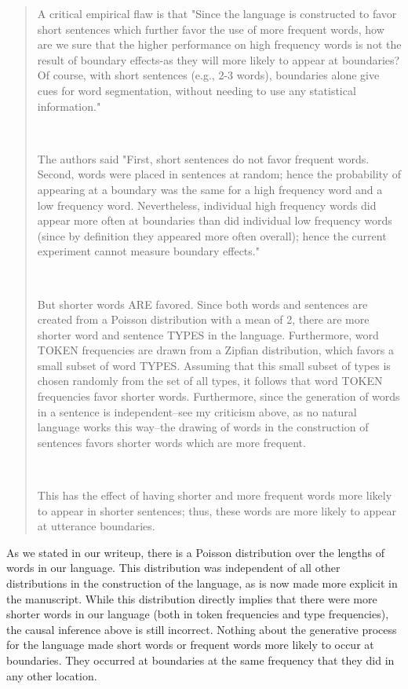 \documentclass[12pt]{letter}
\begin{document}
\begin{quote}
A critical empirical flaw is that "Since the language is constructed to favor short sentences which further favor the use of more frequent words, how are we sure that the higher performance on high frequency words is not the result of boundary effects-as they will more likely to appear at boundaries? Of course, with short sentences (e.g., 2-3 words), boundaries alone give cues for word segmentation, without needing to use any statistical information."

~

The authors said "First, short sentences do not favor frequent words. Second, words were placed in sentences at random; hence the probability of appearing at a boundary was the same for a high frequency word and a low frequency word. Nevertheless, individual high frequency words did appear more often at boundaries than did individual low frequency words (since by definition they appeared more often overall); hence the current experiment cannot measure boundary effects."

~

But shorter words ARE favored. Since both words and sentences are created from a Poisson distribution with a mean of 2, there are more shorter word and sentence TYPES in the language. Furthermore, word TOKEN frequencies are drawn from a Zipfian distribution, which favors a small subset of word TYPES. Assuming that this small subset of types is chosen randomly from the set of all types, it follows that word TOKEN frequencies favor shorter words. Furthermore, since the generation of words in a sentence is independent--see my criticism above, as no natural language works this way--the drawing of words in the construction of sentences favors shorter words which are more frequent.

~ 

This has the effect of having shorter and more frequent words more likely to appear in shorter sentences; thus, these words are more likely to appear at utterance boundaries. 
\end{quote}

As we stated in our writeup, there is a Poisson distribution over the lengths of words in our language. This distribution was independent of all other distributions in the construction of the language, as is now made more explicit in the manuscript. While this distribution directly implies that there were more shorter words in our language (both in token frequencies and type frequencies), the causal inference above is still incorrect. Nothing about the generative process for the language made short words or frequent words more likely to occur at boundaries. They occurred at boundaries at the same frequency that they did in any other location. 
\end{document}
